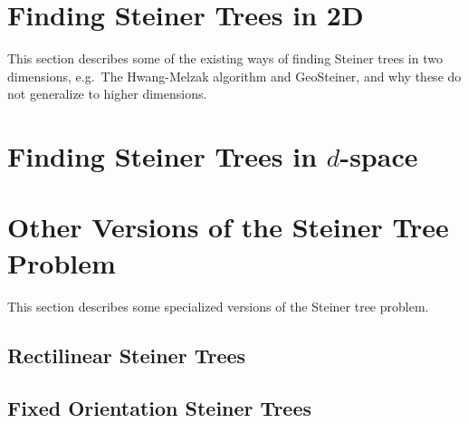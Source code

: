\section{Finding Steiner Trees in 2D}
\label{sec:find-stein-trees-2}

This section describes some of the existing ways of finding Steiner trees in two
dimensions, e.g.\ The Hwang-Melzak algorithm\missingref{} and
GeoSteiner\missingref{}, and why these do not generalize to higher dimensions.


\section{Finding Steiner Trees in $d$-space}
\label{sec:find-stein-trees-d}


\section{Other Versions of the Steiner Tree Problem}
\label{sec:other-vers-stein}

This section describes some specialized versions of the Steiner tree problem.


\subsection{Rectilinear Steiner Trees}
\label{sec:rect-stein-trees}

\subsection{Fixed Orientation Steiner Trees}
\label{sec:fixed-orient-stein}

\chapterbreak{}

